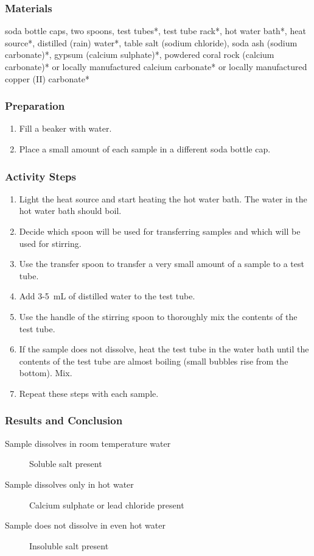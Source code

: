 \subsubsection{Materials}
soda bottle caps, two spoons, test tubes*, test tube rack*, hot water bath*, heat source*, distilled (rain) water*, table salt (sodium chloride), soda ash (sodium carbonate)*, gypsum (calcium sulphate)*, powdered coral rock (calcium carbonate)* or locally manufactured calcium carbonate* or locally manufactured copper (II) carbonate*

\subsubsection{Preparation}
\begin{enumerate}
\item{Fill a beaker with water.}
\item{Place a small amount of each sample in a different soda bottle cap.}
\end{enumerate}

\subsubsection{Activity Steps}
\begin{enumerate}
\item{Light the heat source and start heating the hot water bath. The water in the hot water bath should boil.}
\item{Decide which spoon will be used for transferring samples and which will be used for stirring.}
\item{Use the transfer spoon to transfer a very small amount of a sample to a test tube.}
\item{Add 3-5~mL of distilled water to the test tube.}
\item{Use the handle of the stirring spoon to thoroughly mix the contents of the test tube.}
\item{If the sample does not dissolve, heat the test tube in the water bath until the contents of the test tube are almost boiling (small bubbles rise from the bottom). Mix.}
\item{Repeat these steps with each sample.}

\end{enumerate}

\subsubsection{Results and Conclusion}
\begin{description}
\item[Sample dissolves in room temperature water]{Soluble salt present}
\item[Sample dissolves only in hot water]{Calcium sulphate or lead chloride present}
\item[Sample does not dissolve in even hot water]{Insoluble salt present}
\end{description}

